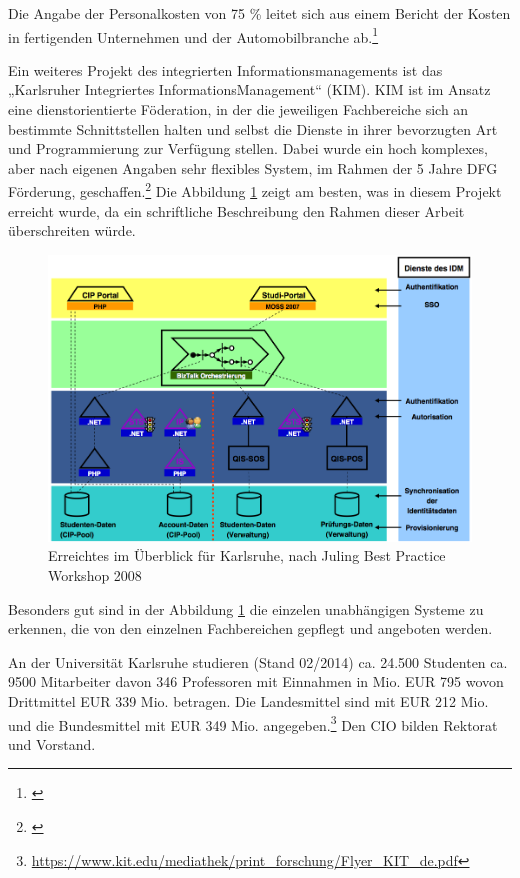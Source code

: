 Die Angabe der Personalkosten von 75 \%  leitet sich aus einem Bericht der Kosten in fertigenden Unternehmen und der Automobilbranche ab.\footnote{\cite{schuelein_2009}}

Ein weiteres Projekt des integrierten Informationsmanagements ist das „Karlsruher Integriertes InformationsManagement“ (KIM).
KIM ist im Ansatz eine dienstorientierte Föderation, in der die jeweiligen Fachbereiche sich an bestimmte Schnittstellen 
halten und selbst die Dienste in ihrer bevorzugten Art und Programmierung zur Verfügung stellen. Dabei wurde ein hoch komplexes, 
aber nach eigenen Angaben sehr flexibles System, im Rahmen der 5 Jahre DFG Förderung, geschaffen.\footnote{\cite{bode_informationsmanagement_2010}}
Die Abbildung \ref{fig_ubersicht_karlsruhe} zeigt am besten, was in diesem Projekt erreicht wurde, da ein schriftliche Beschreibung den Rahmen dieser Arbeit überschreiten würde.

\newpage

\begin{figure}[h!]
	\centering
	\includegraphics[width=\textwidth]
	{kapitel/gruppe4_2/bilder/ubersicht_karlsruhe}
	\caption{Erreichtes im Überblick für Karlsruhe, nach Juling Best Practice Workshop 2008}
	\label{fig_ubersicht_karlsruhe}
\end{figure}

Besonders gut sind in der Abbildung \ref{fig_ubersicht_karlsruhe} die einzelen unabhängigen Systeme zu erkennen, die von den einzelnen Fachbereichen gepflegt und angeboten werden. 

\newpage

An der Universität Karlsruhe studieren (Stand 02/2014) ca. 24.500 Studenten ca. 9500 Mitarbeiter davon 346 Professoren mit Einnahmen in Mio. EUR 795 wovon Drittmittel EUR 339 Mio. betragen. Die Landesmittel sind mit EUR 212 Mio. und die Bundesmittel mit EUR 349 Mio. angegeben.\footnote{\url{https://www.kit.edu/mediathek/print_forschung/Flyer_KIT_de.pdf}} Den CIO bilden Rektorat und Vorstand.

